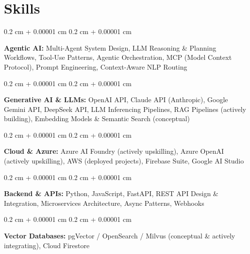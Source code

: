 \documentclass[10pt, letterpaper]{article}
\newenvironment{onecolentry}{
    \begin{adjustwidth}{
        0.2 cm + 0.00001 cm
    }{
        0.2 cm + 0.00001 cm
    }
}{
    \end{adjustwidth}
}
\begin{document}
        \vspace{0.2 cm}


    \section{Skills}

        \begin{onecolentry}
            \textbf{Agentic AI:} Multi-Agent System Design, LLM Reasoning \& Planning Workflows, Tool-Use Patterns, Agentic Orchestration, MCP (Model Context Protocol), Prompt Engineering, Context-Aware NLP Routing
        \end{onecolentry}

        \vspace{0.2 cm}

        \begin{onecolentry}
            \textbf{Generative AI \& LLMs:} OpenAI API, Claude API (Anthropic), Google Gemini API, DeepSeek API, LLM Inferencing Pipelines, RAG Pipelines (actively building), Embedding Models \& Semantic Search (conceptual)
        \end{onecolentry}

        \vspace{0.2 cm}

        \begin{onecolentry}
            \textbf{Cloud \& Azure:} Azure AI Foundry (actively upskilling), Azure OpenAI (actively upskilling), AWS (deployed projects), Firebase Suite, Google AI Studio
        \end{onecolentry}

        \vspace{0.2 cm}

        \begin{onecolentry}
            \textbf{Backend \& APIs:} Python, JavaScript, FastAPI, REST API Design \& Integration, Microservices Architecture, Async Patterns, Webhooks
        \end{onecolentry}

        \vspace{0.2 cm}

        \begin{onecolentry}
            \textbf{Vector Databases:} pgVector / OpenSearch / Milvus (conceptual \& actively integrating), Cloud Firestore
        \end{onecolentry}

        \vspace{0.2 cm}
\end{document}

